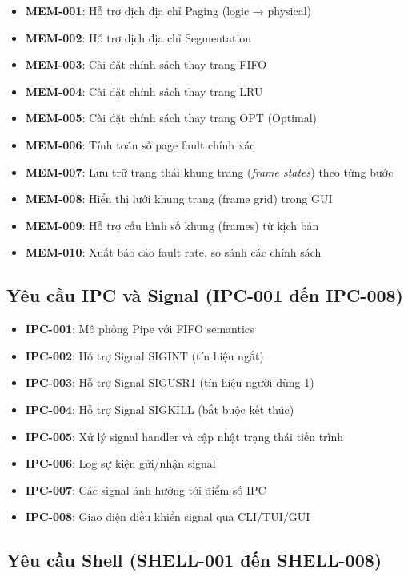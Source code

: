 \begin{itemize}[leftmargin=1.5cm]
  \item \textbf{MEM-001}: Hỗ trợ dịch địa chỉ Paging (logic → physical)
  \item \textbf{MEM-002}: Hỗ trợ dịch địa chỉ Segmentation
  \item \textbf{MEM-003}: Cài đặt chính sách thay trang FIFO
  \item \textbf{MEM-004}: Cài đặt chính sách thay trang LRU
  \item \textbf{MEM-005}: Cài đặt chính sách thay trang OPT (Optimal)
  \item \textbf{MEM-006}: Tính toán số page fault chính xác
  \item \textbf{MEM-007}: Lưu trữ trạng thái khung trang (\textit{frame states}) theo từng bước
  \item \textbf{MEM-008}: Hiển thị lưới khung trang (frame grid) trong GUI
  \item \textbf{MEM-009}: Hỗ trợ cấu hình số khung (frames) từ kịch bản
  \item \textbf{MEM-010}: Xuất báo cáo fault rate, so sánh các chính sách
\end{itemize}

\subsection{Yêu cầu IPC và Signal (IPC-001 đến IPC-008)}

\begin{itemize}[leftmargin=1.5cm]
  \item \textbf{IPC-001}: Mô phỏng Pipe với FIFO semantics
  \item \textbf{IPC-002}: Hỗ trợ Signal SIGINT (tín hiệu ngắt)
  \item \textbf{IPC-003}: Hỗ trợ Signal SIGUSR1 (tín hiệu người dùng 1)
  \item \textbf{IPC-004}: Hỗ trợ Signal SIGKILL (bắt buộc kết thúc)
  \item \textbf{IPC-005}: Xử lý signal handler và cập nhật trạng thái tiến trình
  \item \textbf{IPC-006}: Log sự kiện gửi/nhận signal
  \item \textbf{IPC-007}: Các signal ảnh hưởng tới điểm số IPC
  \item \textbf{IPC-008}: Giao diện điều khiển signal qua CLI/TUI/GUI
\end{itemize}

\subsection{Yêu cầu Shell (SHELL-001 đến SHELL-008)}

